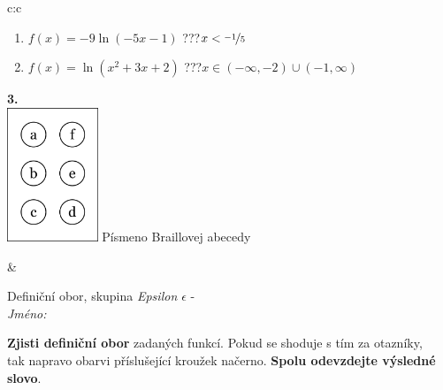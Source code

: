 \documentclass[10pt]{report}
\begin{document}
\begin{tabular}{c:c}
\begin{minipage}[c][104.5mm][t]{0.5\linewidth}
\begin{center}
\begin{minipage}{0.79\linewidth}
\begin{center}
\begin{varwidth}{\linewidth}
\begin{enumerate}
\item $f(x)=-9\ln{(-5x-1)}$\quad \dotfill\; ???\;\dotfill \quad $x<\nicefrac{-1}{5}$
\item $f(x)=\ln{(x^2+3x+2)}$\quad \dotfill\; ???\;\dotfill \quad $x\in(-\infty , -2)\cup(-1 , \infty)$
\end{enumerate}
\end{varwidth}
\end{center}
\end{minipage}
\begin{minipage}{0.20\linewidth}
\begin{center}
{\Huge\bfseries 3.} \\[2mm]
\includegraphics[height=40mm]{../images/braille.png}
{\small Písmeno Braillovej abecedy}
\end{center}
\end{minipage}
\end{center}
\end{minipage}
&
\begin{minipage}[c][104.5mm][t]{0.5\linewidth}
\begin{center}
\vspace{7mm}
{\huge Definiční obor, skupina \textit{Epsilon $\epsilon$} -}\\[5mm]
\textit{Jméno:}\phantom{xxxxxxxxxxxxxxxxxxxxxxxxxxxxxxxxxxxxxxxxxxxxxxxxxxxxxxxxxxxxxxxxx}\\[5mm]
\begin{minipage}{0.95\linewidth}
\begin{center}
\textbf{Zjisti definiční obor} zadaných funkcí. Pokud se shoduje s tím za otazníky,\\tak napravo obarvi příslušející kroužek načerno. \textbf{Spolu odevzdejte výsledné slovo}.
\end{center}
\end{minipage}
\\[1mm]
\begin{minipage}{0.79\linewidth}
\begin{center}
\begin{varwidth}{\linewidth}
\begin{enumerate}

\end{enumerate}
\end{varwidth}
\end{center}
\end{minipage}
\end{center}
\end{minipage}
\end{tabular}
\end{document}
